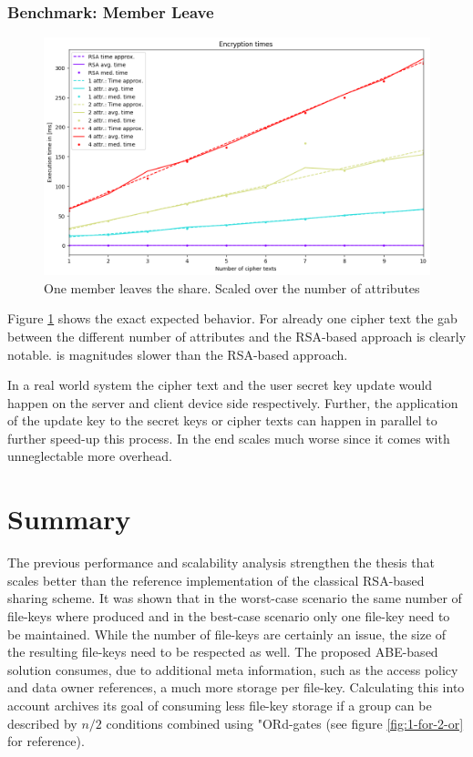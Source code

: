 \subsubsection{Benchmark: Member Leave}
\begin{figure}[!ht]
\centering
    \includegraphics[width=\linewidth]{img/eval-leave/leave_attr_1_users_2.png}
    \caption{One member leaves the share. Scaled over the number of attributes}
    \label{fig:member-leave}
\end{figure}

Figure \ref{fig:member-leave} shows the exact expected behavior. For already one cipher text the gab between the different number of attributes and the RSA-based approach is clearly notable. \name is magnitudes slower than the RSA-based approach.

In a real world system the cipher text and the user secret key update would happen on the server and client device side respectively. Further, the application of the update key to the secret keys or cipher texts can happen in parallel to further speed-up this process. In the end \name scales much worse since it comes with unneglectable more overhead. 

\section{Summary}
The previous performance and scalability analysis strengthen the thesis that \name scales better than the reference implementation of the classical RSA-based sharing scheme. It was shown that in the worst-case scenario the same number of file-keys where produced and in the best-case scenario only one file-key need to be maintained. While the number of file-keys are certainly an issue, the size of the resulting file-keys need to be respected as well. The proposed ABE-based solution consumes, due to additional meta information, such as the access policy and data owner references, a much more storage per file-key. Calculating this into account \name archives its goal of consuming less file-key storage if a group can be described by $n/2$ conditions combined using "ORd-gates (see figure \ref{fig:1-for-2-or} for reference).

